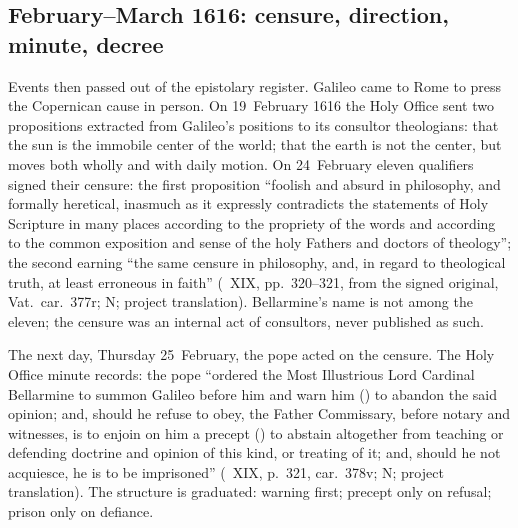 
\subsection{February--March 1616: censure, direction, minute,
decree}

Events then passed out of the epistolary register. Galileo came
to Rome to press the Copernican cause in person. On 19~February
1616 the Holy Office sent two propositions extracted from
Galileo's positions to its consultor theologians: that the sun is
the immobile center of the world; that the earth is not the
center, but moves both wholly and with daily motion. On
24~February eleven qualifiers signed their censure: the first
proposition ``foolish and absurd in philosophy, and formally
heretical, inasmuch as it expressly contradicts the statements of
Holy Scripture in many places according to the propriety of the
words and according to the common exposition and sense of the
holy Fathers and doctors of theology''; the second earning ``the
same censure in philosophy, and, in regard to theological truth,
at least erroneous in faith'' (~XIX, pp.~320--321,
from the signed original, Vat.\ car.\ 377r; N; project
translation). Bellarmine's name is not among the eleven; the
censure was an internal act of consultors, never published as
such.

The next day, Thursday 25~February, the pope acted on the
censure. The Holy Office minute records: the pope ``ordered the
Most Illustrious Lord Cardinal Bellarmine to summon Galileo
before him and warn him () to abandon the said
opinion; and, should he refuse to obey, the Father Commissary,
before notary and witnesses, is to enjoin on him a precept
() to abstain altogether from teaching or
defending doctrine and opinion of this kind, or treating of it;
and, should he not acquiesce, he is to be imprisoned''
(~XIX, p.~321, car.\ 378v; N; project translation).
The structure is graduated: warning first; precept only on
refusal; prison only on defiance.


